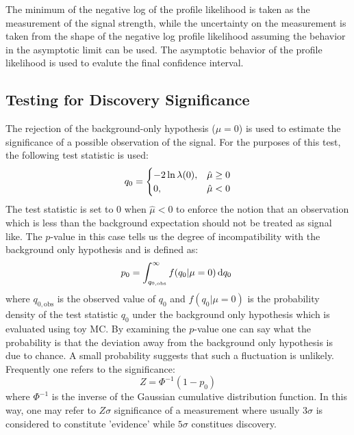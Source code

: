 The minimum of the negative log of the profile likelihood 
is taken as the measurement of the signal strength, while
the uncertainty on the measurement is taken from the shape of the 
negative log profile likelihood assuming the behavior in the asymptotic
limit can be used.  The asymptotic behavior of the profile likelihood 
is used to evalute the final confidence interval. 


\subsection{Testing for Discovery Significance}
The rejection of the background-only hypothesis ($\mu = 0$) is used to estimate the significance of a possible observation of the signal.
For the purposes of this test, the following test 
statistic is used:
\begin{equation}
q_{0} = 
\begin{cases}
\hfill -2 \ln \lambda(0),\hfill & \hat{\mu} \geq 0 \\
0,\hfill & \hat{\mu} < 0
\end{cases}
\label{eq:q0}
\end{equation}
The test statistic is set to $0$ when $\hat{\mu} < 0$ to enforce
the notion that an observation which is less than the background
expectation should not be treated as signal like. The $p$-value in this case
tells us the degree of incompatibility with the background only hypothesis
and is defined as:
\begin{equation}
p_0=\int^{\infty }_{q_{0,\textrm{obs}}} f(q_0|\mu=0) \mathop{}\!\mathrm{d}q_0~
\label{eq:pvalue}
\end{equation}
where $q_{0,\textrm{obs}}$ is the observed value of $q_0$ and 
$f(q_0|\mu=0)$ is the probability density of the test statistic $q_0$ under
the background only hypothesis which is evaluated using toy MC. %
By examining the $p$-value one can say what the probability is 
that the deviation away from the background only hypothesis is due
to chance. A small probability suggests that such a fluctuation is
unlikely. Frequently one refers to the significance:
\begin{equation}
Z = \Phi^{-1}(1-p_0)
\label{eq:significance}
\end{equation}
where $\Phi^{-1}$ is the inverse of the Gaussian cumulative distribution function.
In this way, one may refer to $Z\sigma$ significance of a measurement where usually
$3\sigma$ is considered to constitute 'evidence' while $5\sigma$ constitues
discovery.

